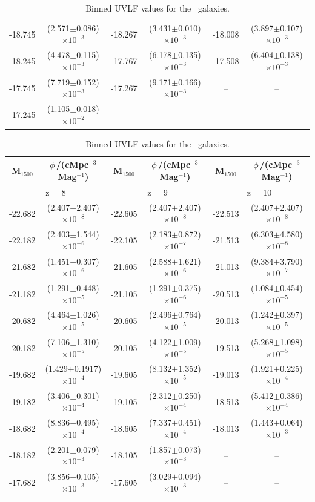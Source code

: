 \begin{table}
\begin{tabular}[t]{cccccc}
		-18.745 &  (2.571$\pm$0.086)$\times 10^{-3}$ & -18.267 &  (3.431$\pm$0.010)$\times 10^{-3}$ & -18.008 &  (3.897$\pm$0.107)$\times 10^{-3}$ \\
		-18.245 &  (4.478$\pm$0.115)$\times 10^{-3}$ & -17.767 &  (6.178$\pm$0.135)$\times 10^{-3}$ & -17.508 &  (6.404$\pm$0.138)$\times 10^{-3}$ \\
		-17.745 &  (7.719$\pm$0.152)$\times 10^{-3}$ & -17.267 &  (9.171$\pm$0.166)$\times 10^{-3}$ &   -- &  --  \\
		-17.245 &  (1.105$\pm$0.018)$\times 10^{-2}$ &   -- &  -- &  -- &   -- \\
		\hline
	\end{tabular}
	\begin{tabular}[t]{cccccc}
		\hline
		M$_{1500}$ &  $\phi$\,/(cMpc$^{-3}$ Mag$^{-1}$) & M$_{1500}$ &  $\phi$\,/(cMpc$^{-3}$ Mag$^{-1}$) & M$_{1500}$ &  $\phi$\,/(cMpc$^{-3}$ Mag$^{-1}$)\\
		\hline
		\multicolumn{2}{c}{z = 8} & \multicolumn{2}{c}{z = 9} & \multicolumn{2}{c}{z = 10} \\
		\hline
		-22.682 &  (2.407$\pm$2.407)$\times 10^{-8}$ & -22.605 &  (2.407$\pm$2.407)$\times 10^{-8}$ & -22.513 &  (2.407$\pm$2.407)$\times 10^{-8}$ \\
		-22.182 &  (2.403$\pm$1.544)$\times 10^{-6}$ & -22.105 &  (2.183$\pm$0.872)$\times 10^{-7}$ & -21.513 &  (6.303$\pm$4.580)$\times 10^{-8}$ \\
		-21.682 &  (1.451$\pm$0.307)$\times 10^{-6}$ & -21.605 &  (2.588$\pm$1.621)$\times 10^{-6}$ & -21.013 &  (9.384$\pm$3.790)$\times 10^{-7}$ \\
		-21.182 &  (1.291$\pm$0.448)$\times 10^{-5}$ & -21.105 &  (1.291$\pm$0.375)$\times 10^{-6}$ & -20.513 &  (1.084$\pm$0.454)$\times 10^{-5}$ \\
		-20.682 &  (4.464$\pm$1.026)$\times 10^{-5}$ & -20.605 &  (2.496$\pm$0.764)$\times 10^{-5}$ & -20.013 &  (1.242$\pm$0.397)$\times 10^{-5}$ \\
		-20.182 &  (7.106$\pm$1.310)$\times 10^{-5}$ & -20.105 &  (4.122$\pm$1.009)$\times 10^{-5}$ & -19.513 &  (5.268$\pm$1.098)$\times 10^{-5}$ \\
		-19.682 &  (1.429$\pm$0.1917)$\times 10^{-4}$ & -19.605 &  (8.132$\pm$1.352)$\times 10^{-5}$ & -19.013 &  (1.921$\pm$0.225)$\times 10^{-4}$ \\
		-19.182 &  (3.406$\pm$0.301)$\times 10^{-4}$ & -19.105 &  (2.312$\pm$0.250)$\times 10^{-4}$ & -18.513 &  (5.412$\pm$0.386)$\times 10^{-4}$ \\
		-18.682 &  (8.836$\pm$0.495)$\times 10^{-4}$ & -18.605 &  (7.337$\pm$0.451)$\times 10^{-4}$ & -18.013 &  (1.443$\pm$0.064)$\times 10^{-3}$ \\
		-18.182 &  (2.201$\pm$0.079)$\times 10^{-3}$ & -18.105 &  (1.857$\pm$0.073)$\times 10^{-3}$ &   -- &  -- \\
		-17.682 &  (3.856$\pm$0.105)$\times 10^{-3}$ & -17.605 &  (3.029$\pm$0.094)$\times 10^{-3}$ &   -- &  -- \\
		\hline
	\end{tabular}
	\caption{Binned UVLF values for the \flares\, galaxies. \label{tab: LF values}}
\end{table}
